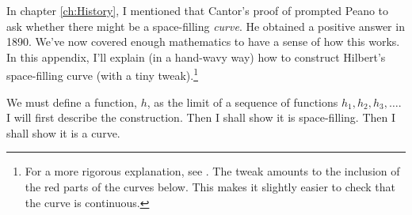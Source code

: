 \documentclass[../../../include/open-logic-section]{subfiles}
\begin{document}
In chapter \ref{ch:History}, I mentioned that Cantor's proof of  prompted Peano to ask whether there might be a space-filling \emph{curve}. He obtained a positive answer in 1890. We've now covered enough mathematics to have a sense of how this works. In this appendix, I'll explain (in a hand-wavy way) how to construct Hilbert's space-filling curve (with a tiny tweak).\footnote{For a more rigorous explanation, see \cite{RoseUnpublished}. The tweak amounts to the inclusion of the red parts of the curves below. This makes it slightly easier to check that the curve is continuous.}

We must define a function, $h$, as the limit of a sequence of functions $h_1, h_2, h_3, \ldots$. I will first describe the construction. Then I shall show it is space-filling. Then I shall show it is a curve. 
\end{document}
